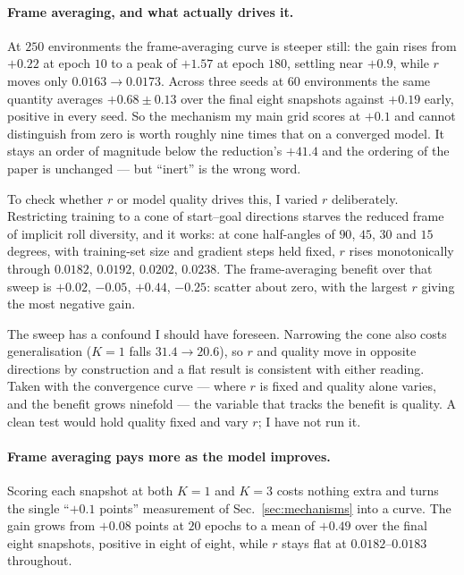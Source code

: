 \documentclass[11pt,a4paper]{article}
\begin{document}
\paragraph{Frame averaging, and what actually drives it.} At $250$ environments
the frame-averaging curve is steeper still: the gain rises from $+0.22$ at epoch
$10$ to a peak of $+1.57$ at epoch $180$, settling near $+0.9$, while $r$ moves
only $0.0163 \to 0.0173$. Across three seeds at $60$ environments the same
quantity averages $+0.68 \pm 0.13$ over the final eight snapshots against
$+0.19$ early, positive in every seed. So the mechanism my main grid scores at $+0.1$ and
cannot distinguish from zero is worth roughly nine times that on a converged
model. It stays an order of magnitude below the reduction's $+41.4$ and the
ordering of the paper is unchanged --- but ``inert'' is the wrong word.

To check whether $r$ or model quality drives this, I varied $r$ deliberately.
Restricting training to a cone of start--goal directions starves the reduced
frame of implicit roll diversity, and it works: at cone half-angles of $90$,
$45$, $30$ and $15$ degrees, with training-set size and gradient steps held
fixed, $r$ rises monotonically through $0.0182$, $0.0192$, $0.0202$, $0.0238$.
The frame-averaging benefit over that sweep is $+0.02$, $-0.05$, $+0.44$,
$-0.25$: scatter about zero, with the largest $r$ giving the most negative gain.

The sweep has a confound I should have foreseen. Narrowing the cone also costs
generalisation ($K{=}1$ falls $31.4 \to 20.6$), so $r$ and quality move in
opposite directions by construction and a flat result is consistent with either
reading. Taken with the convergence curve --- where $r$ is fixed and quality
alone varies, and the benefit grows ninefold --- the variable that tracks the
benefit is quality. A clean test would hold quality fixed and vary $r$; I have
not run it.

\paragraph{Frame averaging pays more as the model improves.} Scoring each
snapshot at both $K{=}1$ and $K{=}3$ costs nothing extra and turns the single
``$+0.1$ points'' measurement of Sec.~\ref{sec:mechanisms} into a curve. The
gain grows from $+0.08$ points at $20$ epochs to a mean of $+0.49$ over the final
eight snapshots, positive in eight of eight, while $r$ stays flat at
$0.0182$--$0.0183$ throughout.
\end{document}
